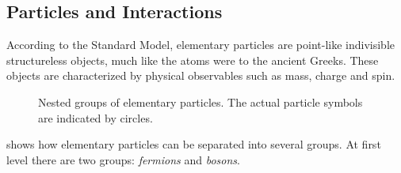 \subsection{Particles and Interactions}
According to the Standard Model, elementary particles are point-like indivisible structureless objects, much like the atoms were to the ancient Greeks. These objects are characterized by physical observables such as mass, charge and spin.

\begin{figure}
    \centering
    \caption{Nested groups of elementary particles. The actual particle symbols are indicated by circles.}
    \label{fig:particle_groups}
\end{figure}

 shows how elementary particles can be separated into several groups. 
At first level there are two groups: \emph{fermions} and \emph{bosons}.

